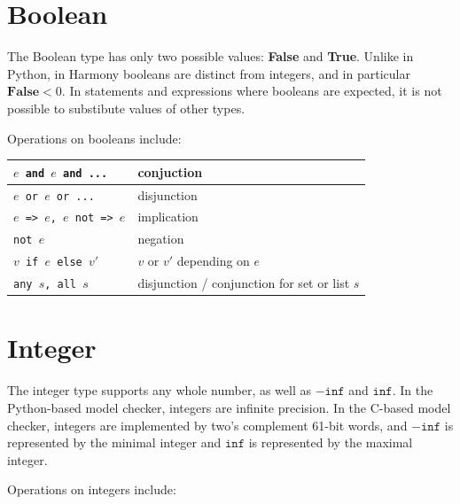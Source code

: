 \documentclass{report}
\begin{document}
\section{Boolean}

The Boolean type has only two possible values: \textbf{False} and
\textbf{True}.  Unlike in Python, in Harmony booleans are distinct
from integers, and in particular $\mathbf{False} < 0$.  In statements
and expressions where booleans are expected, it is not possible to
substibute values of other types.

Operations on booleans include:
\begin{center}
\begin{tabular}{|l|l|}
\hline
\texttt{$e$ and $e$ and ...} & conjuction \\
\hline
\texttt{$e$ or $e$ or ...} & disjunction \\
\hline
\texttt{$e$ => $e$, $e$ not => $e$} & implication \\
\hline
\texttt{not $e$} & negation \\
\hline
\texttt{$v$ if $e$ else $v'$} & $v$ or $v'$ depending on $e$ \\
\hline
\texttt{any $s$, all $s$} & disjunction / conjunction for set or list $s$ \\
\hline
\end{tabular}
\end{center}

\section{Integer}

The integer type supports any whole number, as well as $-\mathtt{inf}$
and $\mathtt{inf}$.  In the Python-based model checker, integers are
infinite precision.  In the C-based model checker, integers are implemented
by two's complement 61-bit words, and $-\mathtt{inf}$ is represented by
the minimal integer and $\mathtt{inf}$ is represented by the maximal integer.

Operations on integers include:
\end{document}

